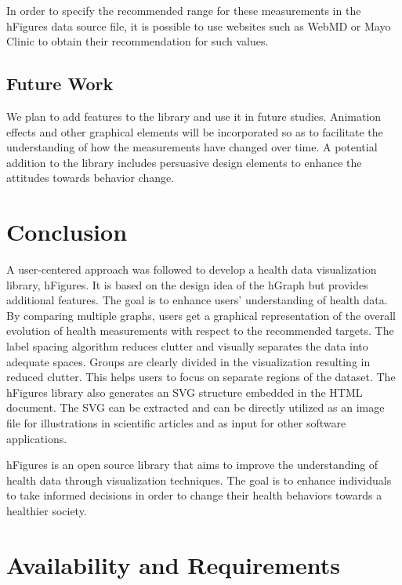 \documentclass[twocolumn]{bmcart}%
\begin{document}
In order to specify the recommended range for these measurements in the hFigures data source file, it is possible to use websites such as WebMD or Mayo Clinic to obtain their recommendation for such values.

\subsection*{Future Work}

We plan to add features to the library and use it in future studies. Animation effects and other graphical elements will be incorporated so as to facilitate the understanding of how the measurements have changed over time. A potential addition to the library includes persuasive design elements to enhance the attitudes towards behavior change.

\section*{Conclusion}

A user-centered approach was followed to develop a health data visualization library, hFigures. It is based on the design idea of the hGraph but provides additional features. The goal is to enhance users' understanding of health data.
By comparing multiple graphs, users get a graphical representation of the overall evolution of health measurements with respect to the recommended targets. The label spacing algorithm reduces clutter and visually separates the data into adequate spaces. Groups are clearly divided in the visualization resulting in reduced clutter. This helps users to focus on separate regions of the dataset. The hFigures library also generates an SVG structure embedded in the HTML document. The SVG can be extracted and can be directly utilized as an image file for illustrations in scientific articles and as input for other software applications.

hFigures is an open source library that aims to improve the understanding of health data through visualization techniques. The goal is to enhance individuals to take informed decisions in order to change their health behaviors towards a healthier society.


\section*{Availability and Requirements}
\end{document}
